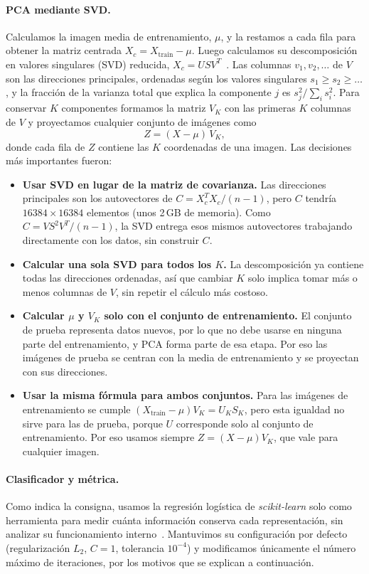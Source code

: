 \documentclass[11pt,a4paper]{article}
\begin{document}
\paragraph{PCA mediante SVD.} Calculamos la imagen media de entrenamiento, $\mu$, y la restamos a cada fila
para obtener la matriz centrada $X_c = X_{\text{train}} - \mu$. Luego calculamos su descomposición en
valores singulares (SVD) reducida, $X_c = U S V^T$~\cite{teoricas}. Las columnas $v_1, v_2, \dots$ de $V$
son las direcciones principales, ordenadas según los valores singulares $s_1 \ge s_2 \ge \dots$, y la
fracción de la varianza total que explica la componente $j$ es $s_j^2/\sum_i s_i^2$. Para conservar $K$
componentes formamos la matriz $V_K$ con las primeras $K$ columnas de $V$ y proyectamos cualquier conjunto
de imágenes como
\[ Z = (X - \mu)\,V_K , \]
donde cada fila de $Z$ contiene las $K$ coordenadas de una imagen. Las decisiones más importantes fueron:
\begin{itemize}
  \item \textbf{Usar SVD en lugar de la matriz de covarianza.} Las direcciones principales son los
        autovectores de $C = X_c^TX_c/(n-1)$, pero $C$ tendría $16384\times16384$ elementos (unos 2\,GB de
        memoria). Como $C = VS^2V^T/(n-1)$, la SVD entrega esos mismos autovectores trabajando directamente
        con los datos, sin construir $C$.
  \item \textbf{Calcular una sola SVD para todos los $K$.} La descomposición ya contiene todas las
        direcciones ordenadas, así que cambiar $K$ solo implica tomar más o menos columnas de $V$, sin
        repetir el cálculo más costoso.
  \item \textbf{Calcular $\mu$ y $V_K$ solo con el conjunto de entrenamiento.} El conjunto de prueba
        representa datos nuevos, por lo que no debe usarse en ninguna parte del entrenamiento, y PCA forma
        parte de esa etapa. Por eso las imágenes de prueba se centran con la media de entrenamiento y se
        proyectan con sus direcciones.
  \item \textbf{Usar la misma fórmula para ambos conjuntos.} Para las imágenes de entrenamiento se cumple
        $(X_{\text{train}}-\mu)V_K = U_KS_K$, pero esta igualdad no sirve para las de prueba, porque $U$
        corresponde solo al conjunto de entrenamiento. Por eso usamos siempre $Z=(X-\mu)V_K$, que vale para
        cualquier imagen.
\end{itemize}

\paragraph{Clasificador y métrica.} Como indica la consigna, usamos la regresión logística de
\emph{scikit-learn} solo como herramienta para medir cuánta información conserva cada
representación, sin analizar su funcionamiento interno~\cite{mahmood}. Mantuvimos su configuración por
defecto (regularización $L_2$, $C=1$, tolerancia $10^{-4}$) y modificamos únicamente el número máximo de
iteraciones, por los motivos que se explican a continuación.
\end{document}
